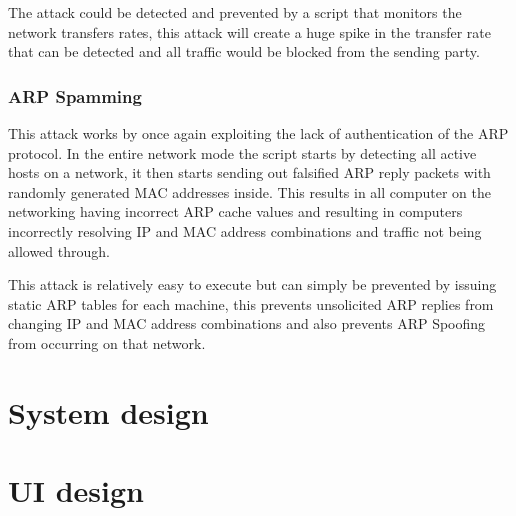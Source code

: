 The attack could be detected and prevented by a script that monitors the network transfers rates, this attack will create a huge spike in the transfer rate that can be detected and all traffic would be blocked from the sending party.

\subsubsection{ARP Spamming}
This attack works by once again exploiting the lack of authentication of the ARP protocol. In the entire network mode the script starts by detecting all active hosts on a network, it then starts sending out falsified ARP reply packets with randomly generated MAC addresses inside. This results in all computer on the networking having incorrect ARP cache values and resulting in computers incorrectly resolving IP and MAC address combinations and traffic not being allowed through.

This attack is relatively easy to execute but can simply be prevented by issuing static ARP tables for each machine, this prevents unsolicited ARP replies from changing IP and MAC address combinations and also prevents ARP Spoofing from occurring on that network.

\section{System design}





\section{UI design}



